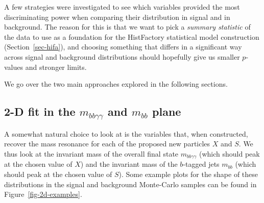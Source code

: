 \documentclass[
  11pt,
  numbers=noendperiod]{book}
\begin{document}
A few strategies were investigated to see which variables provided the
most discriminating power when comparing their distribution in signal
and in background. The reason for this is that we want to pick a
\emph{summary statistic} of the data to use as a foundation for the
HistFactory statistical model construction (Section~\ref{sec-hifa}), and
choosing something that differs in a significant way across signal and
background distributions should hopefully give us smaller \(p\)-values
and stronger limits.

We go over the two main approaches explored in the following sections.

\hypertarget{d-fit-in-the-m_bbgammagamma-and-m_bb-plane}{%
\subsection{\texorpdfstring{2-D fit in the \(m_{bb\gamma\gamma}\) and
\(m_{bb}\)
plane}{2-D fit in the m\_\{bb\textbackslash gamma\textbackslash gamma\} and m\_\{bb\} plane}}\label{d-fit-in-the-m_bbgammagamma-and-m_bb-plane}}

A somewhat natural choice to look at is the variables that, when
constructed, recover the mass resonance for each of the proposed new
particles \(X\) and \(S\). We thus look at the invariant mass of the
overall final state \(m_{bb\gamma\gamma}\) (which should peak at the
chosen value of \(X\)) and the invariant mass of the \(b\)-tagged jets
\(m_{bb}\) (which should peak at the chosen value of \(S\)). Some
example plots for the shape of these distributions in the signal and
background Monte-Carlo samples can be found in
Figure~\ref{fig-2d-examples}.
\end{document}
